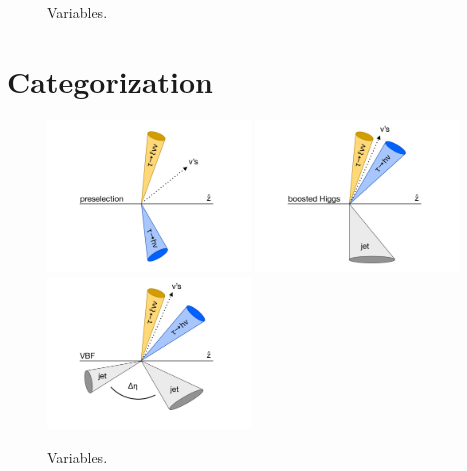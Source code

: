 \begin{figure}[tp]
  \caption{Variables.}
  \label{fig:strategy-objects-btag}
\end{figure}

\section{Categorization}
\label{sec:strategy-categorization}

\begin{figure}[tp]
  \centering
  \includegraphics[width=0.48\textwidth]{figures/category-cartoons/presel}
  \includegraphics[width=0.48\textwidth]{figures/category-cartoons/boost}
  \includegraphics[width=0.48\textwidth]{figures/category-cartoons/vbf}
  \caption{Variables.}
  \label{fig:strategy-category-cartoons}
\end{figure}

